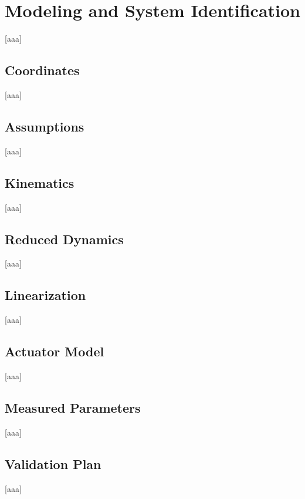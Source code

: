 \chapter{Modeling and System Identification} \label{sec:Modeling and System Identification}
    [aaa]

\section{Coordinates} \label{sec:Coordinates}
    [aaa]

\section{Assumptions} \label{sec:Assumptions}
    [aaa]

\section{Kinematics} \label{sec:Kinematics}
    [aaa]

\section{Reduced Dynamics} \label{sec:Reduced Dynamics}
    [aaa]

\section{Linearization} \label{sec:Linearization}
    [aaa]

\section{Actuator Model} \label{sec:Actuator Model}
    [aaa]

\section{Measured Parameters} \label{sec:Measured Parameters}
    [aaa]

\section{Validation Plan} \label{sec:Validation Plan}
    [aaa]